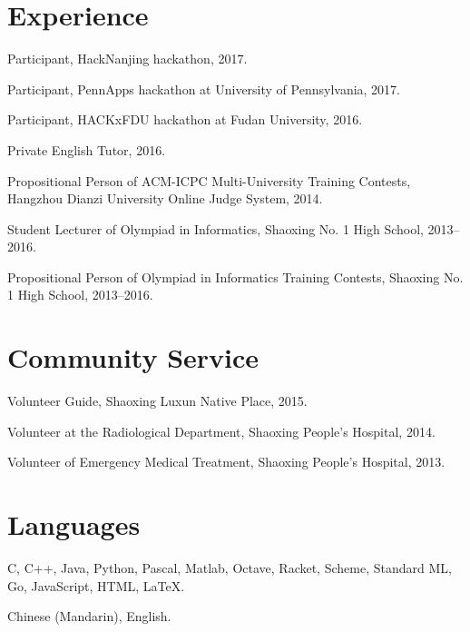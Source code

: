 \documentclass[letterpaper]{article}
\renewenvironment{itemize}{
  \begin{list}{}{
    \setlength{\leftmargin}{1.5em}
  }
}{
  \end{list}
}
\begin{document}
\section*{Experience}

\begin{itemize}
  \item Participant, HackNanjing hackathon, 2017.

  \item Participant, PennApps hackathon at University of Pennsylvania, 2017.

  \item Participant, HACKxFDU hackathon at Fudan University, 2016.

  \item Private English Tutor, 2016.

  \item Propositional Person of ACM-ICPC Multi-University Training Contests, Hangzhou Dianzi University Online Judge System, 2014.

  \item Student Lecturer of Olympiad in Informatics, Shaoxing No. 1 High School, 2013--2016.
 
  \item Propositional Person of Olympiad in Informatics Training Contests, Shaoxing No. 1 High School, 2013--2016.
\end{itemize}


\section*{Community Service}

\begin{itemize}
  \item Volunteer Guide, Shaoxing Luxun Native Place, 2015.

  \item Volunteer at the Radiological Department, Shaoxing People's Hospital, 2014.

  \item Volunteer of Emergency Medical Treatment, Shaoxing People's Hospital, 2013.
    
\end{itemize}


\section*{Languages}

\begin{itemize}
  \item C, C++, Java, Python, Pascal, Matlab, Octave, Racket, Scheme, Standard ML, Go, JavaScript, HTML, \LaTeX.
  \item Chinese (Mandarin), English.
\end{itemize}
\end{document}
